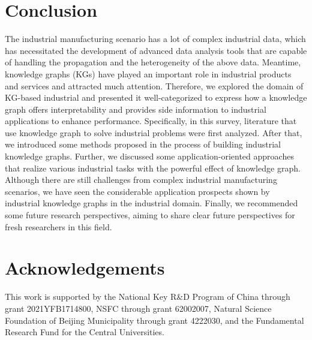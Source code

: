 \documentclass[11pt]{article}
\begin{document}
\section{Conclusion}\label{sec7}
\par{The industrial manufacturing scenario has a lot of complex industrial data, which has necessitated the development of advanced data analysis tools that are capable of handling the propagation and the heterogeneity of the above data.
Meantime, knowledge graphs (KGs) have played an important role in industrial products and services and attracted much attention.
Therefore, we explored the domain of KG-based industrial and presented it well-categorized to express how a knowledge graph offers interpretability and provides side information to industrial applications to enhance performance.
Specifically, in this survey, literature that use knowledge graph to solve industrial problems were first analyzed.
After that, we introduced some methods proposed in the process of building industrial knowledge graphs.
Further, we discussed some application-oriented approaches that realize various industrial tasks with the powerful effect of knowledge graph.
Although there are still challenges from complex industrial manufacturing scenarios, we have seen the considerable application prospects shown by industrial knowledge graphs in the industrial domain.
Finally, we recommended some future research perspectives, aiming to share clear future perspectives for fresh researchers in this field.}


\section*{Acknowledgements}
This work is supported by the National Key R\&D Program of China through grant 2021YFB1714800, NSFC through grant 62002007, Natural Science Foundation of Beijing Municipality through grant 4222030, and the Fundamental Research Fund for the Central Universities.
\end{document}
